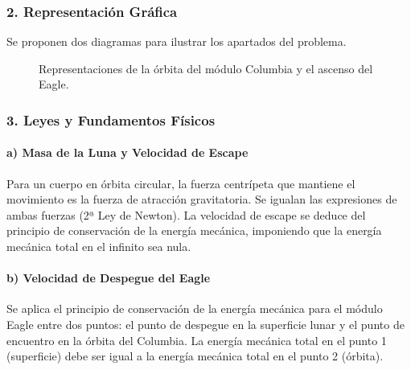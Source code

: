 \subsubsection*{2. Representación Gráfica}
Se proponen dos diagramas para ilustrar los apartados del problema.
\begin{figure}[H]
    \centering
    \hfill
    \caption{Representaciones de la órbita del módulo Columbia y el ascenso del Eagle.}
\end{figure}

\subsubsection*{3. Leyes y Fundamentos Físicos}
\paragraph*{a) Masa de la Luna y Velocidad de Escape}
Para un cuerpo en órbita circular, la fuerza centrípeta que mantiene el movimiento es la fuerza de atracción gravitatoria. Se igualan las expresiones de ambas fuerzas (2ª Ley de Newton). La velocidad de escape se deduce del principio de conservación de la energía mecánica, imponiendo que la energía mecánica total en el infinito sea nula.

\paragraph*{b) Velocidad de Despegue del Eagle}
Se aplica el principio de conservación de la energía mecánica para el módulo Eagle entre dos puntos: el punto de despegue en la superficie lunar y el punto de encuentro en la órbita del Columbia. La energía mecánica total en el punto 1 (superficie) debe ser igual a la energía mecánica total en el punto 2 (órbita).

